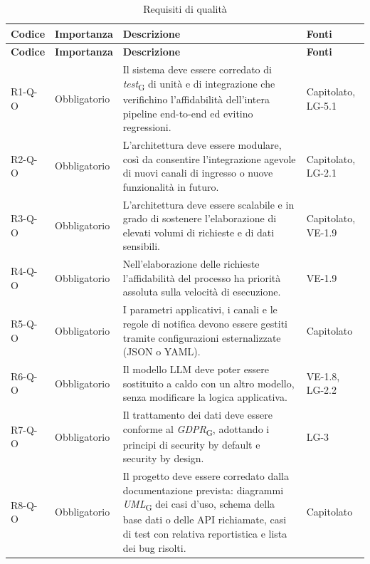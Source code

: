 {
    \small
    \renewcommand{\arraystretch}{1.3}
    \begin{longtable}{|>{\raggedright\arraybackslash}p{1.8cm}|>{\raggedright\arraybackslash}p{2.3cm}|>{\raggedright\arraybackslash}p{6.6cm}|>{\raggedright\arraybackslash}p{3.1cm}|}
    \caption{Requisiti di qualità}\label{tab:req-qualita}\\
    \hline
    \rowcolor[gray]{0.88} \textbf{Codice} & \textbf{Importanza} & \textbf{Descrizione} & \textbf{Fonti} \\ \hline
    \endfirsthead
    \hline
    \rowcolor[gray]{0.88} \textbf{Codice} & \textbf{Importanza} & \textbf{Descrizione} & \textbf{Fonti} \\ \hline
    \endhead
    \mbox{R1-Q-O} & Obbligatorio & Il sistema deve essere corredato di \textit{test}\textsubscript{G} di unità e di integrazione che verifichino l'affidabilità dell'intera pipeline end-to-end ed evitino regressioni. & \mbox{Capitolato}, \mbox{LG-5.1} \\ \hline
    \mbox{R2-Q-O} & Obbligatorio & L'architettura deve essere modulare, così da consentire l'integrazione agevole di nuovi canali di ingresso o nuove funzionalità in futuro. & \mbox{Capitolato}, \mbox{LG-2.1} \\ \hline
    \mbox{R3-Q-O} & Obbligatorio & L'architettura deve essere scalabile e in grado di sostenere l'elaborazione di elevati volumi di richieste e di dati sensibili. & \mbox{Capitolato}, \mbox{VE-1.9} \\ \hline
    \mbox{R4-Q-O} & Obbligatorio & Nell'elaborazione delle richieste l'affidabilità del processo ha priorità assoluta sulla velocità di esecuzione. & \mbox{VE-1.9} \\ \hline
    \mbox{R5-Q-O} & Obbligatorio & I parametri applicativi, i canali e le regole di notifica devono essere gestiti tramite configurazioni esternalizzate (JSON o YAML). & \mbox{Capitolato} \\ \hline
    \mbox{R6-Q-O} & Obbligatorio & Il modello LLM deve poter essere sostituito a caldo con un altro modello, senza modificare la logica applicativa. & \mbox{VE-1.8}, \mbox{LG-2.2} \\ \hline
    \mbox{R7-Q-O} & Obbligatorio & Il trattamento dei dati deve essere conforme al \textit{GDPR}\textsubscript{G}, adottando i principi di security by default e security by design. & \mbox{LG-3} \\ \hline
    \mbox{R8-Q-O} & Obbligatorio & Il progetto deve essere corredato dalla documentazione prevista: diagrammi \textit{UML}\textsubscript{G} dei casi d'uso, schema della base dati o delle API richiamate, casi di test con relativa reportistica e lista dei bug risolti. & \mbox{Capitolato} \\ \hline

\end{longtable}}

